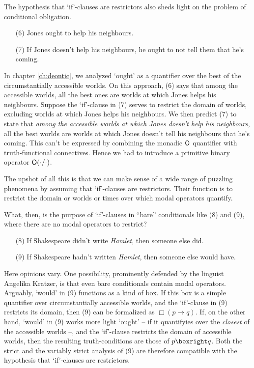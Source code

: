 The hypothesis that `if'-clauses are restrictors also sheds light on the problem
of conditional obligation.
\begin{enumerate}[leftmargin=10mm]
  \itemsep-1mm  
  \item[(6)] Jones ought to help his neighbours.
  \item[(7)] If Jones doesn't help his neighbours, he ought to not tell them that he's coming.
\end{enumerate}
In chapter \ref{ch:deontic}, we analyzed `ought' as a quantifier over the best
of the circumstantially accessible worlds. On this approach, (6) says that among
the accessible worlds, all the best ones are worlds at which Jones helps his
neighbours. Suppose the `if'-clause in (7) serves to restrict the domain of
worlds, excluding worlds at which Jones helps his neighbours. We then predict
(7) to state that \emph{among the accessible worlds at which Jones doesn't help
  his neighbours}, all the best worlds are worlds at which Jones doesn't tell
his neighbours that he's coming. This can't be expressed by combining the
monadic $\operatorname{\mathsf{O}}$ quantifier with truth-functional connectives. Hence we had to
introduce a primitive binary operator $\operatorname{\mathsf{O}}(\cdot/\cdot)$.


The upshot of all this is that we can make sense of a wide range of puzzling
phenomena by assuming that `if'-clauses are restrictors. Their function is to
restrict the domain or worlds or times over which modal operators quantify.

What, then, is the purpose of `if'-clauses in ``bare'' conditionals like (8) and
(9), where there are no modal operators to restrict?
\begin{enumerate}[leftmargin=10mm]
  \itemsep-1mm
  \item[(8)] If Shakespeare didn't write \emph{Hamlet}, then someone else did.
  \item[(9)] If Shakespeare hadn't written \emph{Hamlet}, then someone else
        would have.
\end{enumerate}

Here opinions vary. One possibility, prominently defended by the linguist
Angelika Kratzer, is that even bare conditionals contain modal operators.
Arguably, `would' in (9) functions as a kind of box. If this box is a simple
quantifier over circumstantially accessible worlds, and the `if'-clause in (9)
restricts its domain, then (9) can be formalized as $\Box(p \to q)$. If, on the
other hand, `would' in (9) works more light `ought' -- if it quantifyies over the
\emph{closest} of the accessible worlds --, and the `if'-clause restricts the
domain of accessible worlds, then the resulting truth-conditions are those of
$p \boxright q$. Both the strict and the variably strict analysis of (9) are
therefore compatible with the hypothesis that `if'-clauses are restrictors.

